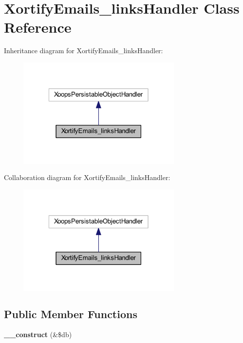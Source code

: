 \hypertarget{class_xortify_emails__links_handler}{\section{Xortify\-Emails\-\_\-links\-Handler Class Reference}
\label{class_xortify_emails__links_handler}
}


Inheritance diagram for Xortify\-Emails\-\_\-links\-Handler\-:
\nopagebreak
\begin{figure}[H]
\begin{center}
\leavevmode
\includegraphics[width=232pt]{class_xortify_emails__links_handler__inherit__graph}
\end{center}
\end{figure}


Collaboration diagram for Xortify\-Emails\-\_\-links\-Handler\-:
\nopagebreak
\begin{figure}[H]
\begin{center}
\leavevmode
\includegraphics[width=232pt]{class_xortify_emails__links_handler__coll__graph}
\end{center}
\end{figure}
\subsection*{Public Member Functions}
\begin{DoxyCompactItemize}
\item 
\hypertarget{class_xortify_emails__links_handler_aaf2ef772755ec6f361d44e16cc9ffd69}{{\bfseries \-\_\-\-\_\-construct} (\&\$db)}\label{class_xortify_emails__links_handler_aaf2ef772755ec6f361d44e16cc9ffd69}

\end{DoxyCompactItemize}



